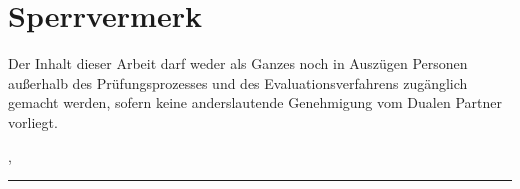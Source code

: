 

\section*{Sperrvermerk}

\vspace*{2em}

Der Inhalt dieser Arbeit darf weder als Ganzes noch in Auszügen Personen außerhalb des Prüfungsprozesses und des Evaluationsverfahrens zugänglich gemacht werden, sofern keine anderslautende Genehmigung vom Dualen Partner vorliegt.

\vspace{3em}

\releaseLocation, \releaseDate
\vspace{4em}

\rule{6cm}{0.4pt}

\documentAuthor
\pagebreak
